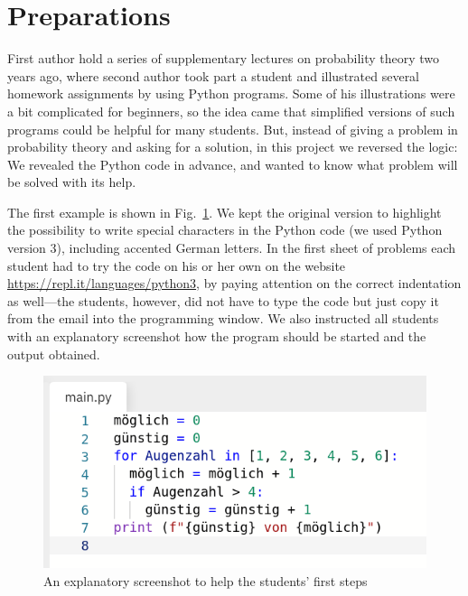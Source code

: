 \documentclass[]{interact}
\theoremstyle{plain}%
\theoremstyle{definition}
\theoremstyle{remark}
\begin{document}
\section{Preparations}
\label{preps}

First author hold a series of supplementary lectures on probability theory two years ago, where second author
took part a student and illustrated several homework assignments by using Python programs.
Some of his illustrations were a bit complicated for beginners, so the idea came that
simplified versions of such programs could be helpful for many students.
But, instead of giving a problem in probability theory and asking for a solution, in this
project we reversed the logic: We revealed the Python code in advance, and wanted to know
what problem will be solved with its help.

The first example is shown in Fig.~\ref{main-py-window}. We kept the original version to highlight
the possibility to write special characters in the Python code (we used Python version 3),
including accented German letters. In the first sheet of problems each student had to try
the code on his or her own on the website \url{https://repl.it/languages/python3},
by paying attention on the correct indentation as well---the students, however, did not have
to type the code but just copy it from the email into the programming window.
We also instructed all students with an
explanatory screenshot how the program should be started and the output obtained.

\begin{figure}
\begin{center}\includegraphics[scale=0.4]{../forms/de_AT/main-py-window}
\caption{An explanatory screenshot to help the students' first steps}
\label{main-py-window}
\end{center}
\end{figure}
\end{document}
